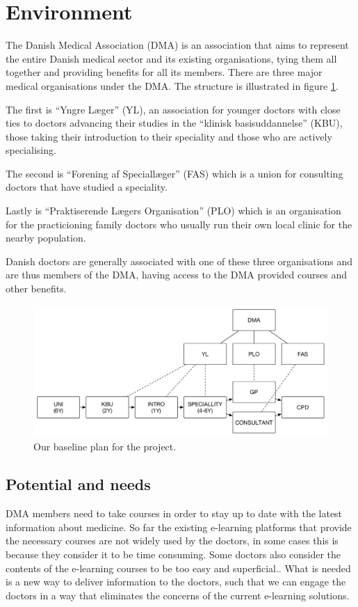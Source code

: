 \section{Environment}
The Danish Medical Association (DMA) is an association that aims to represent the entire Danish medical sector and its existing organisations, tying them all together and providing benefits for all its members. There are three major medical organisations under the DMA. The structure is illustrated in figure \ref{dmaorganisation}.

The first is “Yngre Læger” (YL), an association for younger doctors with close ties to doctors advancing their studies in the “klinisk basisuddannelse” (KBU), those taking their introduction to their speciality and those who are actively specialising.

The second is “Forening af Speciallæger” (FAS) which is a union for consulting doctors that have studied a speciality.

Lastly is “Praktiserende Lægers Organisation” (PLO) which is an organisation for the practicioning family doctors who usually run their own local clinic for the nearby population.

Danish doctors are generally associated with one of these three organisations and are thus members of the DMA, having access to the DMA provided courses and other benefits.

\begin{figure}
 \begin{center}
  \includegraphics[width=1\textwidth]{figures/dma-structure.pdf}
  \caption{Our baseline plan for the project.\label{dmaorganisation}}
 \end{center}
\end{figure}

\subsection{Potential and needs}
DMA members need to take courses in order to stay up to date with the latest information about medicine. So far the existing e-learning platforms that provide the necessary courses are not widely used by the doctors, in some cases this is because they consider it to be time consuming. Some doctors also consider the contents of the e-learning courses to be too easy and superficial.. What is needed is a new way to deliver information to the doctors, such that we can engage the doctors in a way that eliminates the concerns of the current e-learning solutions.

